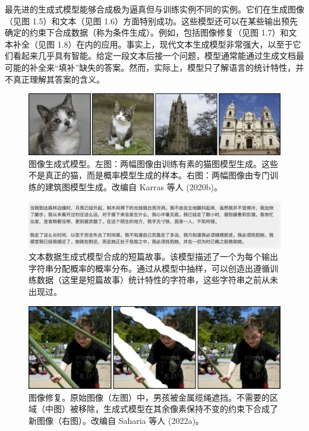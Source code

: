 最先进的生成式模型能够合成极为逼真但与训练实例不同的实例。它们在生成图像（见图 1.5）和文本（见图 1.6）方面特别成功。这些模型还可以在某些输出预先确定的约束下合成数据（称为条件生成）。例如，包括图像修复（见图 1.7）和文本补全（见图 1.8）在内的应用。事实上，现代文本生成模型非常强大，以至于它们看起来几乎具有智能。给定一段文本后接一个问题，模型通常能通过生成文档最可能的补全来“填补”缺失的答案。然而，实际上，模型只了解语言的统计特性，并不真正理解其答案的含义。

\begin{figure}
	\centering
	\includegraphics[width=0.7\linewidth]{png/chapter1/IntroSynthesis}
	\caption{图像生成式模型。左图：两幅图像由训练有素的猫图模型生成。这些不是真正的猫，而是概率模型生成的样本。右图：两幅图像由专门训练的建筑图模型生成。改编自 Karras 等人 (2020b)。}

\end{figure}

\begin{figure}
	\centering
	\includegraphics[width=0.7\linewidth]{png/chapter1/16}
	\caption{文本数据生成式模型合成的短篇故事。该模型描述了一个为每个输出字符串分配概率的概率分布。通过从模型中抽样，可以创造出遵循训练数据（这里是短篇故事）统计特性的字符串，这些字符串之前从未出现过。}
\end{figure}



\begin{figure}
	\centering
	\includegraphics[width=0.7\linewidth]{png/chapter1/IntroCompletion}
	\caption{图像修复。原始图像（左图）中，男孩被金属缆绳遮挡。不需要的区域（中图）被移除，生成式模型在其余像素保持不变的约束下合成了新图像（右图）。改编自 Saharia 等人 (2022a)。}
\end{figure}

